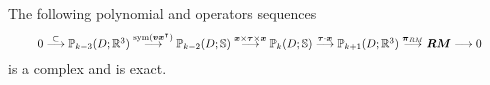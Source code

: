 \begin{lemma}
The following polynomial and operators sequences 
\begin{equation}\label{eq:elas3dKoszulcomplexPoly}
\resizebox{0.92\hsize}{!}{$
0\stackrel{\subset}{\longrightarrow}\mathbb P_{k-3}(D;\mathbb R^3) \stackrel{\sym(\boldsymbol v \boldsymbol x^{\intercal})}{\longrightarrow}
\mathbb P_{k-2}(D;\mathbb S) \stackrel{\boldsymbol x\times \boldsymbol\tau \times \boldsymbol x}{\longrightarrow}
\mathbb P_k(D;\mathbb S) \stackrel{\boldsymbol\tau\cdot \boldsymbol x}{\longrightarrow}
\mathbb P_{k+1}(D;\mathbb R^3)\stackrel{\boldsymbol \pi_{RM}}{\longrightarrow}\boldsymbol{RM}
\stackrel{}{\longrightarrow}0
$}
\end{equation}
is a complex and is exact.
\end{lemma}
